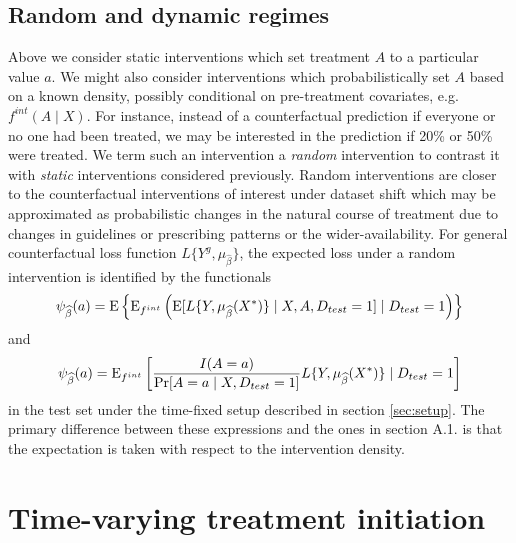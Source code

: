     \subsection{Random and dynamic regimes}\label{sec:randomdynamic}
    Above we consider static interventions which set treatment $A$ to a particular value $a$. We might also consider interventions which probabilistically set $A$ based on a known density, possibly conditional on pre-treatment covariates, e.g. $f^{int}(A \mid X)$. For instance, instead of a counterfactual prediction if everyone or no one had been treated, we may be interested in the prediction if 20\% or 50\% were treated. We term such an intervention a \textit{random} intervention to contrast it with \textit{static} interventions considered previously. Random interventions are closer to the counterfactual interventions of interest under dataset shift which may be approximated as probabilistic changes in the natural course of treatment due to changes in guidelines or prescribing patterns or the wider-availability. For general counterfactual loss function $L\{Y^{g}, \mu_{\widehat{\beta}}\}$, the expected loss under a random intervention is identified by the functionals
    \begin{equation}\label{eqn:rand_cl_estimand}
        \psi_{\widehat{\beta}}(a) = \operatorname{E}\left\{\operatorname{E}_{f^{int}}\left(\operatorname{E}[L\{Y, \mu_{\widehat{\beta}}(X^*)\} \mid X, A, D_{test} = 1] \mid D_{test} = 1\right)\right\}
    \end{equation}
    and 
    \begin{equation}\label{eqn:rand_ipw_estimand}
        \psi_{\widehat{\beta}}(a) = \operatorname{E}_{f^{int}}\left[\frac{I(A = a)}{\Pr[A = a \mid X, D_{test} = 1]}L\{Y, \mu_{\widehat{\beta}}(X^*)\} \mid D_{test} = 1\right]
    \end{equation}
    in the test set under the time-fixed setup described in section \ref{sec:setup}. The primary difference between these expressions and the ones in section A.1. is that the expectation is taken with respect to the intervention density. 


\section{Time-varying treatment initiation}\label{sec:timevarying}
